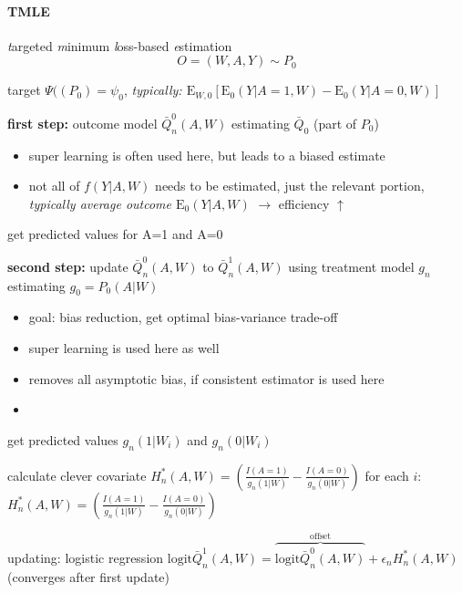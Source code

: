 \documentclass[8pt]{extarticle}
\begin{document}
\begin{multicols}{2}


\paragraph{\large TMLE} \textit{t}argeted \textit{m}inimum \textit{l}oss-based \textit{e}stimation
$$O=(W, A, Y) \sim P_0$$

\noindent target $\Psi((P_0) = \psi_0$, \textit{typically: $\mathrm{E}_{W,0}\left[\mathrm{E}_0(Y|A{=}1,W) - \mathrm{E}_0(Y|A{=}0,W)\right]$}

\noindent \textbf{first step:} outcome model $\bar{Q}^0_n(A,W)$ estimating $\bar{Q}_0$ (part of $P_0$)
\begin{itemize}[leftmargin=*, itemsep=0em, topsep=0pt, partopsep=0pt,parsep=0pt]
\setlength{\itemsep}{0pt}%
\setlength{\parskip}{0pt}
\item  super learning is often used here, but leads to a biased estimate
\item not all of $f(Y|A,W)$ needs to be estimated, just the relevant portion, \textit{typically average  outcome $\mathrm{E}_0(Y|A,W)$}  $\rightarrow$ efficiency $\uparrow$
\end{itemize}
get predicted values for A=1 and A=0

\noindent \textbf{second step:} update $\bar{Q}^0_n(A,W)$ to $\bar{Q}^1_n(A,W)$ using treatment model $g_n$ estimating $g_0 = P_0(A|W)$ 
\begin{itemize}[leftmargin=*, itemsep=0em, topsep=0pt, partopsep=0pt,parsep=0pt]
\setlength{\itemsep}{0pt}%
\setlength{\parskip}{0pt}
\item goal: bias reduction, get optimal bias-variance trade-off
\item super learning is used here as well
\item removes all asymptotic bias, if consistent estimator is used here
\item 
\end{itemize}
get predicted values $g_n(1|W_i)$ and $g_n(0|W_i)$

calculate clever covariate $H^*_n(A,W) = \left(\frac{I(A=1)}{g_n(1|W)} - \frac{I(A=0)}{g_n(0|W)}\right)$ for each $i$: $H^*_n(A,W) = \left(\frac{I(A=1)}{g_n(1|W)} - \frac{I(A=0)}{g_n(0|W)}\right)$

updating: logistic regression $\mathrm{logit} \bar{Q}_n^1(A,W) = \overbrace{\mathrm{logit} \bar{Q}_n^0(A,W)}^{\text{offset}}+ \epsilon_n H_n^*(A,W)$ (converges after first update)


\end{multicols}
\end{document}
